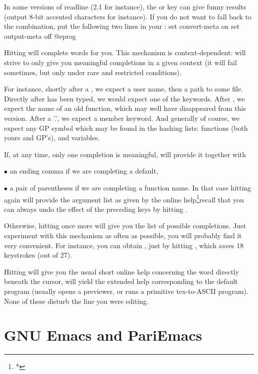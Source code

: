  In some versions of readline (2.1 for instance), the
 or  key can give funny results (output 8-bit accented
characters for instance). If you do not want to fall back to the 
combination, put the following two lines in your :
%
\bprog
  set convert-meta on
  set output-meta off
@eprog

  Hitting
 will complete words for you. This mechanism is context-dependent:
 will strive to only give you meaningful completions in a given
context (it will fail sometimes, but only under rare and restricted
conditions).

  For instance, shortly after a \kbd{\til}, we expect a user name, then a
path to some file. Directly after  has been typed, we would
expect one of the  keywords. After  , we expect
the name of an old function, which may well have disappeared from this
version. After a '.', we expect a member keyword. And generally of course, we
expect any GP symbol which may be found in the hashing lists: functions (both
yours and GP's), and variables.

  If, at any time, only one completion is meaningful,  will provide it
together with

$\bullet$ an ending comma if we are completing a default,

$\bullet$ a pair of parentheses if we are completing a function name. In
that case hitting  again will provide the argument list as given
by the online help\footnote{*}{recall that you can always undo the effect
of the preceding keys by hitting }.

Otherwise, hitting  once more will give you the list of possible
completions. Just experiment with this mechanism as often as possible,
you will probably find it very convenient. For instance, you can obtain
, just by hitting ,
which saves 18 keystrokes (out of 27).

  Hitting  will give you the usual short online help concerning the
word directly beneath the cursor,  will yield the extended help
corresponding to the  default program (usually opens a 
previewer, or runs a primitive tex-to-ASCII program). None of these disturb
the line you were editing.

\section{GNU Emacs and PariEmacs}
\label{se:emacs}

